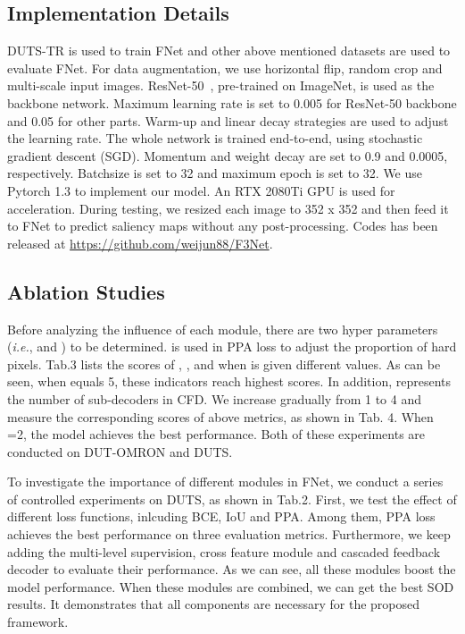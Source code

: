 \documentclass[letterpaper]{article} \usepackage{aaai20}  \usepackage{times}  \usepackage{helvet} \usepackage{courier}  \usepackage[hyphens]{url}  \usepackage{graphicx} \urlstyle{rm} \def\UrlFont{\rm}  \usepackage{graphicx}  \frenchspacing  \setlength{\pdfpagewidth}{8.5in}  \setlength{\pdfpageheight}{11in}
\begin{document}
\subsection{Implementation Details}
DUTS-TR is used to train FNet and other above mentioned datasets are used to evaluate FNet. For data augmentation, we use horizontal flip, random crop and multi-scale input images. ResNet-50~\cite{Resnet}, pre-trained on ImageNet, is used as the backbone network. Maximum learning rate is set to 0.005 for ResNet-50 backbone and 0.05 for other parts. Warm-up and linear decay strategies are used to adjust the learning rate. The whole network is trained end-to-end, using stochastic gradient descent (SGD). Momentum and weight decay are set to 0.9 and 0.0005, respectively. Batchsize is set to 32 and maximum epoch is set to 32. We use Pytorch 1.3 to implement our model. An RTX 2080Ti GPU is used for acceleration. During testing, we resized each image to 352 x 352 and then feed it to FNet to predict saliency maps without any post-processing. Codes has been released at \url{https://github.com/weijun88/F3Net}.

\subsection{Ablation Studies}
Before analyzing the influence of each module, there are two hyper parameters ({\it i.e.},  and ) to be determined.  is used in PPA loss to adjust the proportion of hard pixels. Tab.3 lists the scores of , ,  and  when  is given different values. As can be seen, when  equals 5, these indicators reach highest scores. In addition,  represents the number of sub-decoders in CFD. We increase  gradually from 1 to 4 and measure the corresponding scores of above metrics, as shown in Tab. 4. When =2, the model achieves the best performance. Both of these experiments are conducted on DUT-OMRON and DUTS.

To investigate the importance of different modules in FNet, we conduct a series of controlled experiments on DUTS, as shown in Tab.2. First, we test the effect of different loss functions, inlcuding BCE, IoU and PPA. Among them, PPA loss achieves the best performance on three evaluation metrics. Furthermore, we keep adding the multi-level supervision, cross feature module and cascaded feedback decoder to evaluate their performance. As we can see, all these modules boost the model performance. When these modules are combined, we can get the best SOD results. It demonstrates that all components are necessary for the proposed framework.
\end{document}
